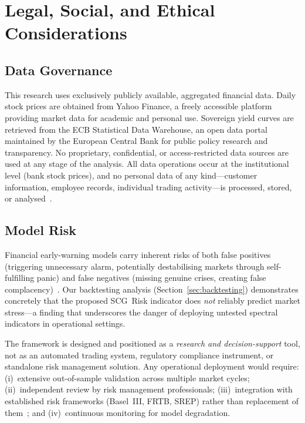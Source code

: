 \chapter*{Legal, Social, and Ethical Considerations}
\label{ch:ethics}

\section*{Data Governance}

This research uses exclusively publicly available, aggregated financial data. Daily stock prices are obtained from Yahoo Finance, a freely accessible platform providing market data for academic and personal use. Sovereign yield curves are retrieved from the ECB Statistical Data Warehouse, an open data portal maintained by the European Central Bank for public policy research and transparency. No proprietary, confidential, or access-restricted data sources are used at any stage of the analysis. All data operations occur at the institutional level (bank stock prices), and no personal data of any kind---customer information, employee records, individual trading activity---is processed, stored, or analysed~\cite{bisias2012survey}.

\section*{Model Risk}

Financial early-warning models carry inherent risks of both false positives (triggering unnecessary alarm, potentially destabilising markets through self-fulfilling panic) and false negatives (missing genuine crises, creating false complacency)~\cite{bisias2012survey,brownlees2017srisk}. Our backtesting analysis (Section~\ref{sec:backtesting}) demonstrates concretely that the proposed SCG~Risk indicator does \emph{not} reliably predict market stress---a finding that underscores the danger of deploying untested spectral indicators in operational settings.

The framework is designed and positioned as a \emph{research and decision-support} tool, not as an automated trading system, regulatory compliance instrument, or standalone risk management solution. Any operational deployment would require: (i)~extensive out-of-sample validation across multiple market cycles; (ii)~independent review by risk management professionals; (iii)~integration with established risk frameworks (Basel~III, FRTB, SREP) rather than replacement of them~\cite{drehmann2013model,borio2011macroprudential}; and (iv)~continuous monitoring for model degradation.

